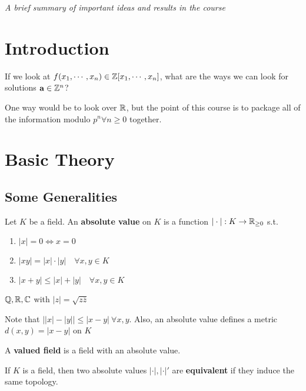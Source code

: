 \documentclass[a4paper]{article}
\begin{document}
\maketitle
{\small \centering
\noindent\emph{A brief summary of important ideas and results in the course}

\setcounter{section}{-1}
\section{Introduction}
If we look at $f(x_1, \cdots, x_n)\in\mathbb{Z}[x_1,\cdots,x_n]$, what are the ways we can look for solutions $\mathbf{a}\in\mathbb{Z}^n$?

One way would be to look over $\mathbb{R}$, but the point of this course is to package all of the information modulo $p^n\forall n\geq0$ together. 

\section{Basic Theory}

\subsection{Some Generalities}
\begin{defi-num}
	Let $K$ be a field. An \textbf{absolute value} on $K$ is a function $|\cdot|:K\rightarrow\mathbb{R}_{\geq 0}$ s.t.
	\begin{enumerate}
		\item $|x|=0\iff x=0$\\
		\item $|xy|=|x|\cdot|y|\quad\forall x,y\in K$\\
		\item $|x+y|\leq|x|+|y|\quad\forall x,y\in K$
	\end{enumerate}
\end{defi-num}
\begin{eg}
	$\mathbb{Q},\mathbb{R},\mathbb{C}$ with $|z|=\sqrt{z\overline{z}}$
\end{eg}
Note that $\left||x| - |y|\right|\leq|x-y|\ \forall x,y$. Also, an absolute value defines a metric $d(x,y)=|x-y|$ on $K$

\begin{defi-num}
	A \textbf{valued field} is a field with an absolute value.
\end{defi-num}

\begin{defi-num}[Equivalent]\label{def:equivalent}
	If $K$ is a field, then two absolute values $|\cdot|,|\cdot|'$ are \textbf{equivalent} if they induce the same topology.
\end{defi-num}

}
\end{document}
